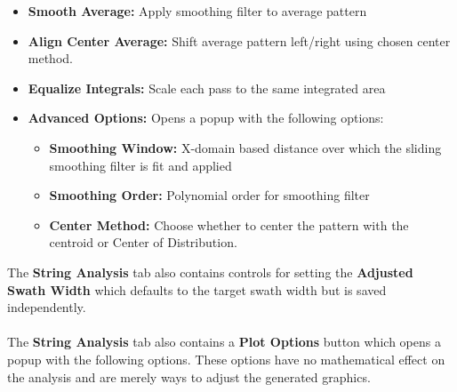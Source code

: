 \documentclass[10pt,letterpaper,titlepage]{article}
\begin{document}
    \begin{itemize}
        \item \textbf{Smooth Average:} Apply smoothing filter to average pattern
        \item \textbf{Align Center Average:} Shift average pattern left/right using chosen center method.
        \item \textbf{Equalize Integrals:} Scale each pass to the same integrated area
        \item \textbf{Advanced Options:} Opens a popup with the following options:
        \begin{itemize}
            \item \textbf{Smoothing Window:} X-domain based distance over which the sliding smoothing filter is fit and applied
            \item \textbf{Smoothing Order:} Polynomial order for smoothing filter
            \item \textbf{Center Method:} Choose whether to center the pattern with the centroid or Center of Distribution.
        \end{itemize}
    \end{itemize}
    The \textbf{String Analysis} tab also contains controls for setting the \textbf{Adjusted Swath Width} which defaults to the target swath width but is saved independently.\\\\
    The \textbf{String Analysis} tab also contains a \textbf{Plot Options} button which opens a popup with the following options. These options have no mathematical effect on the analysis and are merely ways to adjust the generated graphics.
\end{document}
